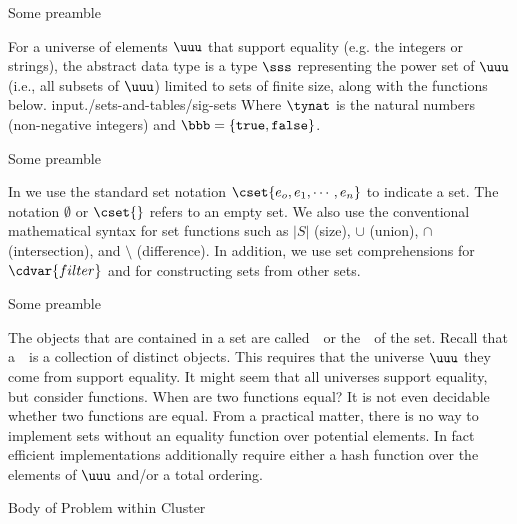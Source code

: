 Some preamble \somecommand
\begin{cluster}
\begin{datatype}[Sets]
\label{XXadt:sets} 
For a universe of elements $\uuu$ that support equality (e.g. the integers or strings), the 
 abstract data type is a type $\sss$ representing the power 
set of $\uuu$ (i.e., all subsets of $\uuu$) limited to sets of finite 
size, along with the functions below. 
{\normalsize
input{./sets-and-tables/sig-sets}
}
Where $\tynat$ is 
the natural numbers (non-negative integers) and $\bbb = \{\texttt{true},
\texttt{false}\}$.

\end{datatype}

Some preamble \somecommand
\begin{syntax}[Sets] 
\label{XXsyn:sets}
In \pml{}  we use the standard set notation $\cset{e_o,e_1,\cdots,e_n}$ to
  indicate a set.  The notation $\emptyset$ or $\cset{}$ refers to an
  empty set. We also use the conventional mathematical syntax for set
  functions such as $|S|$ (size), $\cup$ (union), $\cap$
  (intersection), and $\setminus$ (difference).  In addition, we use
  set comprehensions for $\cdvar{filter}$ and for constructing sets from
  other sets.
\end{syntax}

Some preamble \somecommand
\begin{gram}
  The objects that are contained in a set are called~~or the~~of the set.  Recall that a~~is a collection of distinct objects.  This requires that
  the universe $\uuu$ they come from support equality.  It might seem that
  all universes support equality, but consider functions.  When are
  two functions equal?   It is not even decidable whether two
  functions are equal.   From a practical matter, there is no way to
  implement sets without an equality function over potential
  elements.   In fact efficient implementations additionally require
  either a hash function over the elements of $\uuu$ and/or a total ordering.
\end{gram}


\begin{problem}
Body of Problem within Cluster
\end{problem}

\end{cluster}

